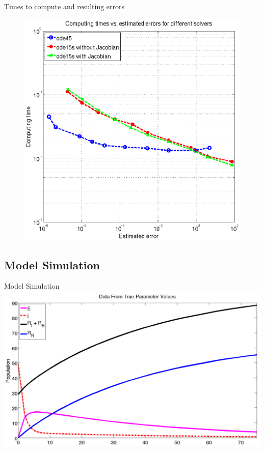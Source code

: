 \documentclass{beamer}
\begin{document}
\begin{frame}{Times to compute and resulting errors}
\centering
\begin{figure}[ht!]
\centering
\includegraphics[scale=0.2]{timeverror} 
\end{figure}
\end{frame}

\subsection{Model Simulation}
\begin{frame}{Model Simulation}
\centering
\includegraphics[scale=0.2]{model}
\end{frame}
\end{document}

